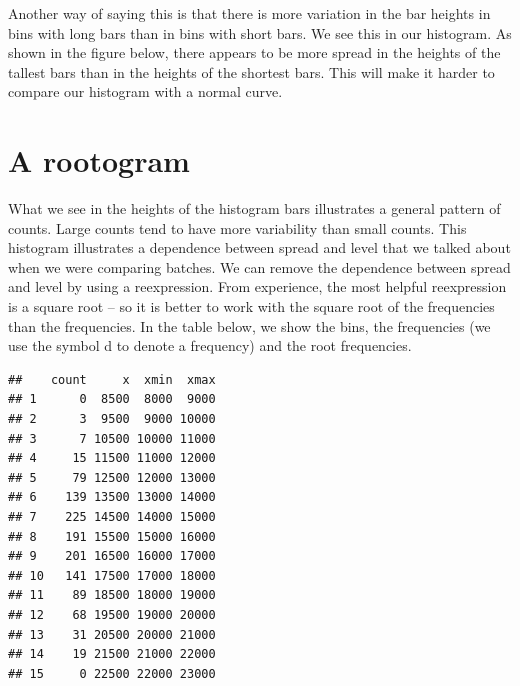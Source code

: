 \documentclass[
]{book}
\newenvironment{Shaded}{\begin{snugshade}}{\end{snugshade}}
\newcommand{\AttributeTok}[1]{\textcolor[rgb]{0.77,0.63,0.00}{#1}}
\newcommand{\DecValTok}[1]{\textcolor[rgb]{0.00,0.00,0.81}{#1}}
\newcommand{\FloatTok}[1]{\textcolor[rgb]{0.00,0.00,0.81}{#1}}
\newcommand{\FunctionTok}[1]{\textcolor[rgb]{0.00,0.00,0.00}{#1}}
\newcommand{\NormalTok}[1]{#1}
\newcommand{\OtherTok}[1]{\textcolor[rgb]{0.56,0.35,0.01}{#1}}
\newcommand{\SpecialCharTok}[1]{\textcolor[rgb]{0.00,0.00,0.00}{#1}}
\begin{document}
Another way of saying this is that there is more variation in the bar heights in bins with long bars than in bins with short bars. We see this in our histogram. As shown in the figure below, there appears to be more spread in the heights of the tallest bars than in the heights of the shortest bars. This will make it harder to compare our histogram with a normal curve.

\hypertarget{a-rootogram}{%
\section{A rootogram}\label{a-rootogram}}

What we see in the heights of the histogram bars illustrates a general pattern of counts. Large counts tend to have more variability than small counts. This histogram illustrates a dependence between spread and level that we talked about when we were comparing batches. We can remove the dependence between spread and level by using a reexpression. From experience, the most helpful reexpression is a square root -- so it is better to work with the square root of the frequencies than the frequencies. In the table below, we show the bins, the frequencies (we use the symbol d to denote a frequency) and the root frequencies.

\begin{Shaded}
\end{Shaded}

\begin{verbatim}
##    count     x  xmin  xmax
## 1      0  8500  8000  9000
## 2      3  9500  9000 10000
## 3      7 10500 10000 11000
## 4     15 11500 11000 12000
## 5     79 12500 12000 13000
## 6    139 13500 13000 14000
## 7    225 14500 14000 15000
## 8    191 15500 15000 16000
## 9    201 16500 16000 17000
## 10   141 17500 17000 18000
## 11    89 18500 18000 19000
## 12    68 19500 19000 20000
## 13    31 20500 20000 21000
## 14    19 21500 21000 22000
## 15     0 22500 22000 23000
\end{verbatim}
\end{document}
